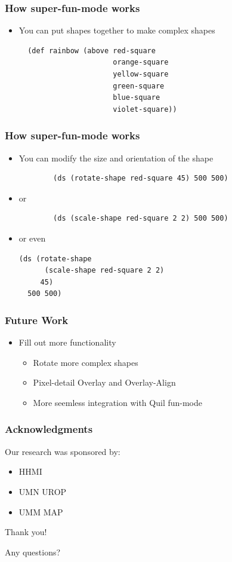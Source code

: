 \documentclass{beamer}
\begin{document}
\begin{frame}[fragile]
	\frametitle{How super-fun-mode works}
	\begin{itemize}
		\item You can put shapes together to make complex shapes
		\begin{verbatim}
  (def rainbow (above red-square 
                      orange-square 
                      yellow-square 
                      green-square 
                      blue-square 
                      violet-square))
		\end{verbatim}
	\end{itemize}
\end{frame}

\begin{frame}[fragile]
	\frametitle{How super-fun-mode works}
	\begin{itemize}
		\item You can modify the size and orientation of the shape
		\begin{verbatim}
		(ds (rotate-shape red-square 45) 500 500)
		\end{verbatim}
		\item or 
		\begin{verbatim}
		(ds (scale-shape red-square 2 2) 500 500)
		\end{verbatim}
		\item or even 
		\begin{verbatim}
(ds (rotate-shape 
      (scale-shape red-square 2 2) 
     45)
  500 500)
		\end{verbatim}
	\end{itemize}
\end{frame}

\begin{frame}
	\frametitle{Future Work}
	\begin{itemize}
		\item Fill out more functionality
		\begin{itemize}
			\item Rotate more complex shapes
			\item Pixel-detail Overlay and Overlay-Align
			\item More seemless integration with Quil fun-mode
		\end{itemize}
	\end{itemize}
\end{frame}




\begin{frame}
\frametitle{Acknowledgments}
	Our research was sponsored by:
	\begin{itemize}
	\item HHMI
	\item UMN UROP
	\item UMM MAP
	\end{itemize}
	{\centering
	\noindent
	Thank you! \par
	Any questions? \par
	}
\end{frame}
\end{document}
